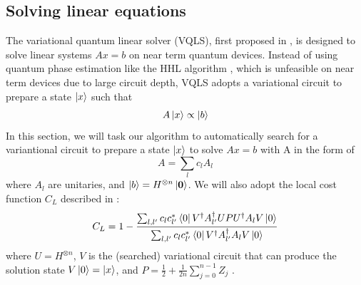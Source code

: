 \documentclass[a4paper,onecolumn,11pt]{quantumarticle}
\begin{document}
\subsection{Solving linear equations}
The variational quantum linear solver (VQLS), first proposed in \cite{Bravo-Prieto_undated-oq}, is designed to solve linear systems $Ax=b$ on near term quantum devices. Instead of using quantum phase estimation like the HHL algorithm \cite{HHL}, which is unfeasible on near term devices due to large circuit depth, VQLS adopts a variational circuit to prepare a state $\ket{x}$ such that 
\begin{equation}
    A\ket{x} \propto \ket{b}
\end{equation}
In this section, we will task our algorithm to automatically search for a variantional circuit to prepare a state $\ket{x}$ to solve $Ax = b$ with A in the form of 
\begin{equation}
    A = \sum_l c_l A_l
\end{equation}
where $A_l$ are unitaries, and $\ket{b} = H^{\otimes n}\ket{\mathbf{0}}$.
\noindent
We will also adopt the local cost function $C_L$ described in \cite{Bravo-Prieto_undated-oq}:
\begin{equation}\label{eqn:vqls_local_loss}
C_{L}=1-\frac{\sum_{l, l^{\prime}} c_{l} c_{l^{\prime}}^{*}\bra{0}V^{\dagger} A_{l^{\prime}}^{\dagger} U P U^{\dagger} A_{l} V\ket{0}}{\sum_{l, l^{\prime}} c_{l} c_{l^{\prime}}^{*}\bra{0}V^{\dagger} A_{l^{\prime}}^{\dagger} A_{l} V\ket{0}}
\end{equation}
where $U=H^{\otimes n}$, $V$ is the (searched) variational circuit that can produce the solution state $V\ket{0} = \ket{x}$, and $P=\frac{1}{2}+\frac{1}{2 n} \sum_{j=0}^{n-1} Z_{j}$ \cite{pennylane_vqls}.
\end{document}
